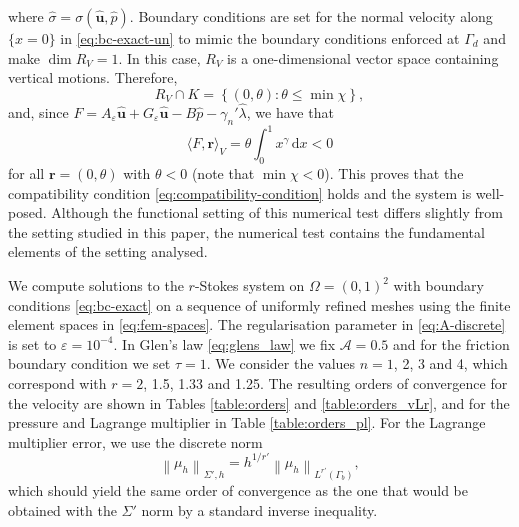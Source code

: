 \documentclass[onefignum,onetabnum]{siamart190516}
\newcommand{\br}{\boldsymbol{r}}
\newcommand{\bu}{\boldsymbol{u}}
\newcommand{\dd}{\mathrm{d}}
\newcommand{\nrm}[1]{\left\lVert#1\right\rVert}
\begin{document}
%
where $\hat{\sigma} = \sigma(\hat{\bu}, \hat{p})$. Boundary conditions are set for the normal velocity along $\{x=0\}$ in \eqref{eq:bc-exact-un} to mimic the boundary conditions enforced at $\Gamma_d$ and make $\dim{R_V} = 1$. In this case, $R_V$ is a one-dimensional vector space containing vertical motions. Therefore, 
%
\[
	R_V \cap K = \left\lbrace (0,\theta): \theta \leq \min{\chi} \right\rbrace,
\]
%
and, since $ F = A_\varepsilon\hat{\bu} + G_\varepsilon\hat{\bu} - B \hat{p} - \gamma_n'\hat{\lambda}$, we have that
%
\[
	\langle F, \br \rangle_V = \theta \int_0^1 x^\gamma\,\dd x < 0
\]
%
for all $\br = (0, \theta)$ with $\theta < 0$ (note that $\min{\chi} < 0$). This proves that the compatibility condition \eqref{eq:compatibility-condition} holds and the system is well-posed. Although the functional setting of this numerical test differs slightly from the setting studied in this paper, the numerical test contains the fundamental elements of the setting analysed.

We compute solutions to the $r$-Stokes system on $\Omega = (0,1)^2$ with boundary conditions \eqref{eq:bc-exact} on a sequence of uniformly refined meshes using the finite element spaces in \eqref{eq:fem-spaces}. The regularisation parameter in \eqref{eq:A-discrete} is set to $\varepsilon = 10^{-4}$. In Glen's law \eqref{eq:glens_law} we fix $\mathcal{A} = 0.5$ and for the friction boundary condition we set $\tau = 1$. We consider the values $n = 1$, 2, 3 and 4, which correspond with $r = 2$, 1.5, 1.33 and 1.25. The resulting orders of convergence for the velocity are shown in Tables \ref{table:orders} and \ref{table:orders_vLr}, and for the pressure and Lagrange multiplier in Table \ref{table:orders_pl}. For the Lagrange multiplier error, we use the discrete norm
%
\[
	\nrm{\mu_h}_{\Sigma',h} = h^{1/r'} \nrm{\mu_h}_{L^{r'}(\Gamma_b)},
\]
%
which should yield the same order of convergence as the one that would be obtained with the $\Sigma'$ norm by a standard inverse inequality.
\end{document}

